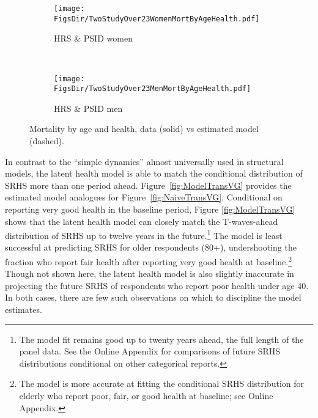 \documentclass[12pt,pdftex,letterpaper]{article}
\newcommand{\RootDir}{..}
\newcommand{\FigsDir}{\RootDir/Figures}
\begin{document}
\begin{figure}
	\centering
	\begin{subfigure}[b]{0.48\textwidth}
		\texttt{[image: \\FigsDir/TwoStudyOver23WomenMortByAgeHealth.pdf]}
		\caption{HRS \& PSID women}\label{fig:TwoStudyWomenMortHealth}
	\end{subfigure}
	~
	\centering
	\begin{subfigure}[b]{0.48\textwidth}
		\texttt{[image: \\FigsDir/TwoStudyOver23MenMortByAgeHealth.pdf]}
		\caption{HRS \& PSID men}\label{fig:TwoStudyMenMortHealth}
	\end{subfigure}
	\caption{Mortality by age and health, data (solid) vs estimated model (dashed).} \label{fig:MortFitByHealth}
\end{figure}


In contrast to the ``simple dynamics'' almost universally used in structural models, the latent health model is able to match the conditional distribution of SRHS more than one period ahead.  Figure~\ref{fig:ModelTransVG} provides the estimated model analogues for Figure~\ref{fig:NaiveTransVG}. Conditional on reporting very good health in the baseline period, Figure \ref{fig:ModelTransVG} shows that the latent health model can closely match the T-waves-ahead distribution of SRHS up to twelve years in the future.\footnote{The model fit remains good up to twenty years ahead, the full length of the panel data. See the Online Appendix for comparisons of future SRHS distributions conditional on other categorical reports.} The model is least successful at predicting SRHS for older respondents (80+), undershooting the fraction who report fair health after reporting very good health at baseline.\footnote{The model is more accurate at fitting the conditional SRHS distribution for elderly who report poor, fair, or good health at baseline; see Online Appendix.} Though not shown here, the latent health model is also slightly inaccurate in projecting the future SRHS of respondents who report poor health under age 40. In both cases, there are few such observations on which to discipline the model estimates.
\end{document}
